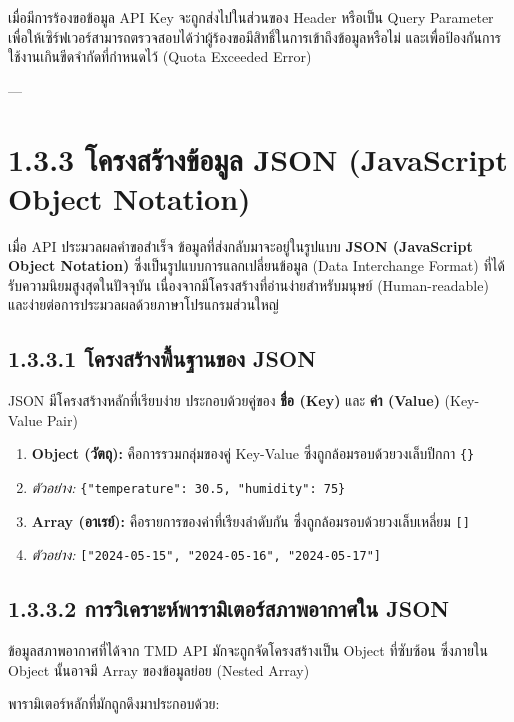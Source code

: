 \documentclass[11pt,a4paper,openany]{report}
\begin{document}
เมื่อมีการร้องขอข้อมูล API Key จะถูกส่งไปในส่วนของ Header หรือเป็น Query Parameter เพื่อให้เซิร์ฟเวอร์สามารถตรวจสอบได้ว่าผู้ร้องขอมีสิทธิ์ในการเข้าถึงข้อมูลหรือไม่ และเพื่อป้องกันการใช้งานเกินขีดจำกัดที่กำหนดไว้ (Quota Exceeded Error)

---

\section{1.3.3 โครงสร้างข้อมูล JSON (JavaScript Object Notation)}


เมื่อ API ประมวลผลคำขอสำเร็จ ข้อมูลที่ส่งกลับมาจะอยู่ในรูปแบบ \textbf{JSON (JavaScript Object Notation)} ซึ่งเป็นรูปแบบการแลกเปลี่ยนข้อมูล (Data Interchange Format) ที่ได้รับความนิยมสูงสุดในปัจจุบัน เนื่องจากมีโครงสร้างที่อ่านง่ายสำหรับมนุษย์ (Human-readable) และง่ายต่อการประมวลผลด้วยภาษาโปรแกรมส่วนใหญ่

\subsection{1.3.3.1 โครงสร้างพื้นฐานของ JSON}


JSON มีโครงสร้างหลักที่เรียบง่าย ประกอบด้วยคู่ของ \textbf{ชื่อ (Key)} และ \textbf{ค่า (Value)} (Key-Value Pair)

\begin{enumerate}
  \item \textbf{Object (วัตถุ):} คือการรวมกลุ่มของคู่ Key-Value ซึ่งถูกล้อมรอบด้วยวงเล็บปีกกา \texttt{\{\}}
  \item \textit{ตัวอย่าง:} \texttt{\{"temperature": 30.5, "humidity": 75\}}
  \item \textbf{Array (อาเรย์):} คือรายการของค่าที่เรียงลำดับกัน ซึ่งถูกล้อมรอบด้วยวงเล็บเหลี่ยม \texttt{[]}
  \item \textit{ตัวอย่าง:} \texttt{["2024-05-15", "2024-05-16", "2024-05-17"]}
\end{enumerate}


\subsection{1.3.3.2 การวิเคราะห์พารามิเตอร์สภาพอากาศใน JSON}


ข้อมูลสภาพอากาศที่ได้จาก TMD API มักจะถูกจัดโครงสร้างเป็น Object ที่ซับซ้อน ซึ่งภายใน Object นั้นอาจมี Array ของข้อมูลย่อย (Nested Array)

พารามิเตอร์หลักที่มักถูกดึงมาประกอบด้วย:
\end{document}
